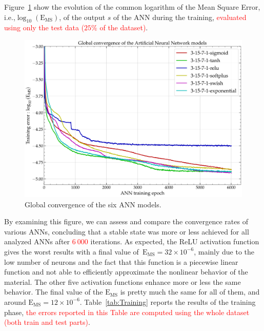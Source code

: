 \documentclass[algorithms,article,submit,pdftex,oneauthors]{Definitions/mdpi}
\makeatletter
\DeclareRobustCommand{\ie}{i.e.,\@\xspace}
\DeclareRobustCommand{\MSE}{\text{E}_\text{MS}}
\makeatother
\begin{document}
Figure~\ref{fig:ANN-conv} show the evolution of the common logarithm of the Mean Square Error, \ie $\log_{10}(\MSE)$, of the output $s$ of the ANN during the training, \textcolor{red}{evaluated using only the test data ($25\%$ of the dataset)}.
\begin{figure}[h!]
\centering
\includegraphics[width=0.7\columnwidth]{Figures/3Cr2Mo-convergence}
\caption{Global convergence of the six ANN models.}
\label{fig:ANN-conv}
\end{figure}
By examining this figure, we can assess and compare the convergence rates of various ANNs, concluding that a stable state was more or less achieved for all analyzed ANNs after \textcolor{red}{$6~000$} iterations.
As expected, the ReLU activation function gives the worst results with a final value of~$\MSE=32\times10^{-6}$, mainly due to the low number of neurons and the fact that this function is a piecewise linear function and not able to efficiently approximate the nonlinear behavior of the material.
The other five activation functions enhance more or less the same behavior.
The final value of the $\MSE$ is pretty much the same for all of them, and around $\MSE=12\times10^{-6}$.
Table~\ref{tab:Training} reports the results of the training phase, \textcolor{red}{the errors reported in this Table are computed using the whole dataset (both train and test parts)}.
\end{document}
